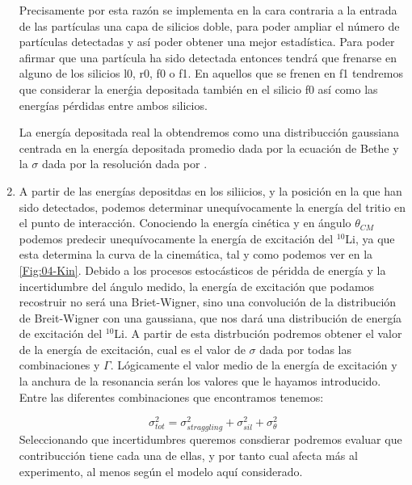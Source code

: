 \begin{enumerate}
    Precisamente por esta razón se implementa en la cara contraria a la entrada de las partículas una capa de silicios doble, para poder ampliar el número de partículas detectadas y así poder obtener una mejor estadística. Para poder afirmar que una partícula ha sido detectada entonces tendrá que frenarse en alguno de los silicios l0, r0, f0 o f1. En aquellos que se frenen en f1 tendremos que considerar la enerǵia depositada también en el silicio f0 así como las energías pérdidas entre ambos silicios.

    La energía depositada real la obtendremos como una distribucción gaussiana centrada en la energía depositada promedio dada por la ecuación de Bethe y la $\sigma$ dada por la resolución dada por \label{Eq:Resolucion_Silicios}.

    \item A partir de las energías depositdas en los siliicios, y la posición en la que han sido detectados, podemos determinar unequívocamente la energía del tritio en el punto de interacción. Conociendo la energía cinética y en ángulo $\theta_{CM}$ podemos predecir unequívocamente la energía de excitación del $^{10}$Li, ya que esta determina la curva de la cinemática, tal y como podemos ver en la \cref{Fig:04-Kin}. Debido a los procesos estocásticos de péridda de energía y la incertidumbre del ángulo medido, la energía de excitación que podamos recostruir no será una Briet-Wigner, sino una convolución de la distribución de Breit-Wigner con una gaussiana, que nos dará una distribución de energía de excitación del $^{10}$Li. A partir de esta distrbución podremos obtener el valor de la energía de excitación, cual es el valor de $\sigma$ dada por todas las combinaciones y $\Gamma$. Lógicamente el valor medio de la energía de excitación y la anchura de la resonancia serán los valores que le hayamos introducido. Entre las diferentes combinaciones que encontramos tenemos:
    
    \begin{equation}
        \sigma_{tot}^2 = \sigma_{straggling}^2 + \sigma_{sil}^2 + \sigma_{\theta}^2 
    \end{equation}
    Seleccionando que incertidumbres queremos consdierar podremos evaluar que contribucción tiene cada una de ellas, y por tanto cual afecta más al experimento, al menos según el modelo aquí considerado. 

\end{enumerate}    
